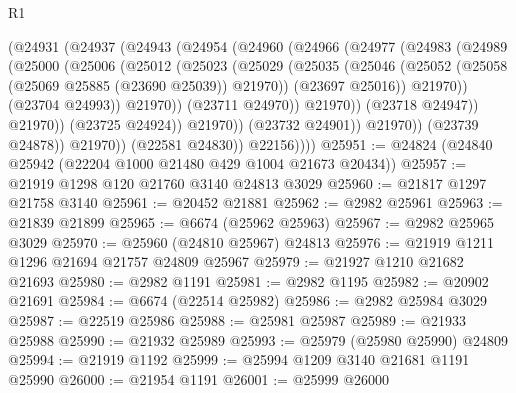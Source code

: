 \begin{lexlean}{R1}
\begin{coremodule}
                        (@24931
                          (@24937
                            (@24943
                              (@24954
                                (@24960
                                  (@24966
                                    (@24977
                                      (@24983
                                        (@24989
                                          (@25000
                                            (@25006
                                              (@25012
                                                (@25023
                                                  (@25029
                                                    (@25035
                                                      (@25046
                                                        (@25052
                                                          (@25058
                                                            (@25069 @25885 (@23690 @25039))
                                                            @21970))
                                                        (@23697 @25016))
                                                      @21970))
                                                  (@23704 @24993))
                                                @21970))
                                            (@23711 @24970))
                                          @21970))
                                      (@23718 @24947))
                                    @21970))
                                (@23725 @24924))
                              @21970))
                          (@23732 @24901))
                        @21970))
                    (@23739 @24878))
                  @21970))
              (@22581 @24830))
            @22156))))
@25951 := @24824 (@24840 @25942 (@22204 @1000 @21480 @429 @1004 @21673 @20434))
@25957 := @21919 @1298 @120 @21760 @3140 @24813 @3029
@25960 := @21817 @1297 @21758 @3140
@25961 := @20452 @21881
@25962 := @2982 @25961
@25963 := @21839 @21899
@25965 := @6674 (@25962 @25963)
@25967 := @2982 @25965 @3029
@25970 := @25960 (@24810 @25967) @24813
@25976 := @21919 @1211 @1296 @21694 @21757 @24809 @25967
@25979 := @21927 @1210 @21682 @21693
@25980 := @2982 @1191
@25981 := @2982 @1195
@25982 := @20902 @21691
@25984 := @6674 (@22514 @25982)
@25986 := @2982 @25984 @3029
@25987 := @22519 @25986
@25988 := @25981 @25987
@25989 := @21933 @25988
@25990 := @21932 @25989
@25993 := @25979 (@25980 @25990) @24809
@25994 := @21919 @1192
@25999 := @25994 @1209 @3140 @21681 @1191 @25990
@26000 := @21954 @1191
@26001 := @25999 @26000

\end{coremodule}
\end{lexlean}
